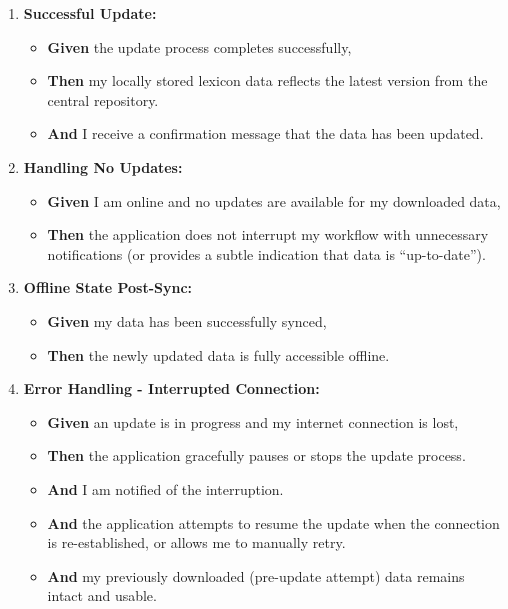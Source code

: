 \documentclass[12pt]{article}
\begin{document}
\begin{enumerate}
    \item \textbf{Successful Update:}
    \begin{itemize}
        \item \textbf{Given} the update process completes successfully,
        \item \textbf{Then} my locally stored lexicon data reflects the latest version from the central repository.
        \item \textbf{And} I receive a confirmation message that the data has been updated.
    \end{itemize}

    \item \textbf{Handling No Updates:}
    \begin{itemize}
        \item \textbf{Given} I am online and no updates are available for my downloaded data,
        \item \textbf{Then} the application does not interrupt my workflow with unnecessary notifications (or provides a subtle indication that data is ``up-to-date'').
    \end{itemize}

    \item \textbf{Offline State Post-Sync:}
    \begin{itemize}
        \item \textbf{Given} my data has been successfully synced,
        \item \textbf{Then} the newly updated data is fully accessible offline.
    \end{itemize}

    \item \textbf{Error Handling - Interrupted Connection:}
    \begin{itemize}
        \item \textbf{Given} an update is in progress and my internet connection is lost,
        \item \textbf{Then} the application gracefully pauses or stops the update process.
        \item \textbf{And} I am notified of the interruption.
        \item \textbf{And} the application attempts to resume the update when the connection is re-established, or allows me to manually retry.
        \item \textbf{And} my previously downloaded (pre-update attempt) data remains intact and usable.
    \end{itemize}


\end{enumerate}
\end{document}
